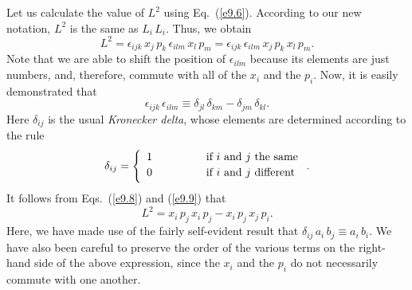 Let us calculate the value of $L^2$ using Eq.~(\ref{e9.6}). According
to our new notation, $L^2$ is the same as $L_i\,L_i$. Thus, we
obtain
\begin{equation}\label{e9.8}
L^2 = \epsilon_{ijk}\,x_j\,p_k\,\epsilon_{ilm}\,x_l\,p_m = 
\epsilon_{ijk}\,\epsilon_{ilm}\,x_j\,p_k\,x_l\,p_m.
\end{equation}
Note that we are able to shift the position of $\epsilon_{ilm}$ because its
elements are just numbers, and, therefore, commute with all of
the $x_i$ and the $p_i$. Now, it is easily demonstrated that
\begin{equation}\label{e9.9}
\epsilon_{ijk}\,\epsilon_{ilm}\equiv \delta_{jl}\,\delta_{km}-\delta_{jm}\,\delta_{kl}.
\end{equation}
Here $\delta_{ij}$ is the usual {\em Kronecker delta}, whose elements
are determined according to the rule
\begin{equation}
\delta_{ij} = \left\{
\begin{array}{rcl}
1 &\mbox{\hspace{1cm}}&\mbox{if $i$ and $j$ the same}\\[0.5ex]
0 &&\mbox{if $i$ and $j$ different}\\[0.5ex]
\end{array}\right. .
\end{equation}
It follows from Eqs.~(\ref{e9.8}) and (\ref{e9.9}) that
\begin{equation}\label{e9.11}
L^2 = x_i\,p_j\,x_i\,p_j - x_i\,p_j\,x_j\,p_i.
\end{equation}
Here, we have made use of the fairly self-evident result that $\delta_{ij}\,a_i\,b_j
\equiv a_i\,b_i$. We have also been careful to preserve the order of
the various terms on the right-hand side of the above expression, since the $x_i$ and the $p_i$ do not necessarily
commute with one another.

